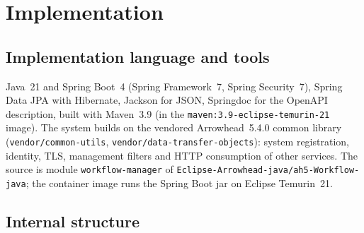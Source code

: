 \documentclass[a4paper]{arrowhead}
\begin{document}
\newpage
\section{Implementation}
\label{sec:implementation}

\subsection{Implementation language and tools}
Java~21 and Spring Boot~4 (Spring Framework~7, Spring Security~7), Spring Data JPA with Hibernate, Jackson for JSON,
Springdoc for the OpenAPI description, built with Maven~3.9 (in the \texttt{maven:3.\allowbreak{}9-\allowbreak{}eclipse-\allowbreak{}temurin-\allowbreak{}21} image). The
system builds on the vendored Arrowhead~5.4.0 common library (\texttt{vendor/\allowbreak{}common-\allowbreak{}utils},
\texttt{vendor/\allowbreak{}data-\allowbreak{}transfer-\allowbreak{}objects}): system registration, identity, TLS, management filters and HTTP consumption
of other services. The source is module \texttt{workflow-\allowbreak{}manager} of \texttt{Eclipse-\allowbreak{}Arrowhead-\allowbreak{}java/\allowbreak{}ah5-\allowbreak{}Workflow-\allowbreak{}java}; the
container image runs the Spring Boot jar on Eclipse Temurin~21.

\subsection{Internal structure}
\end{document}
